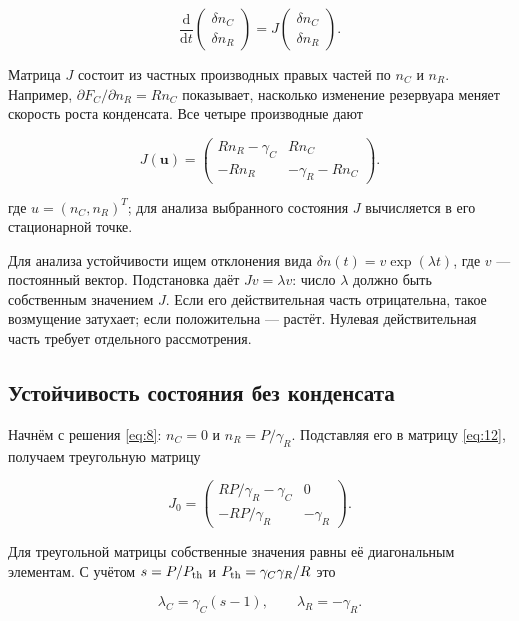 \documentclass[12pt,a4paper]{article}
\begin{document}
\[
\frac{\mathrm d}{\mathrm dt}\begin{pmatrix}\delta n_C\\\delta n_R\end{pmatrix}=J\begin{pmatrix}\delta n_C\\\delta n_R\end{pmatrix}.
\]

Матрица $J$ состоит из частных производных правых частей по $n_{C}$ и $n_{R}$. Например, $\partial F_{C}/\partial n_{R}=R n_{C}$ показывает, насколько изменение резервуара меняет скорость роста конденсата. Все четыре производные дают

\begin{equation}\label{eq:12}
J(\mathbf u)=\begin{pmatrix}Rn_R-\gamma_C&Rn_C\\-Rn_R&-\gamma_R-Rn_C\end{pmatrix}.\end{equation}

где $u=(n_{C},n_{R})^{T}$; для анализа выбранного состояния $J$ вычисляется в его стационарной точке.

Для анализа устойчивости ищем отклонения вида $\delta n(t)=v \exp(\lambda t)$, где $v$ --- постоянный вектор. Подстановка даёт $J v=\lambda v$: число $\lambda$ должно быть собственным значением $J$. Если его действительная часть отрицательна, такое возмущение затухает; если положительна --- растёт. Нулевая действительная часть требует отдельного рассмотрения.

\subsection{Устойчивость состояния без конденсата}\label{sec:3.4}

Начнём с решения \eqref{eq:8}: $n_{C}=0$ и $n_{R}=P/\gamma_{R}$. Подставляя его в матрицу \eqref{eq:12}, получаем треугольную матрицу

\[
J_0=\begin{pmatrix}RP/\gamma_R-\gamma_C&0\\-RP/\gamma_R&-\gamma_R\end{pmatrix}.
\]

Для треугольной матрицы собственные значения равны её диагональным элементам. С учётом $s=P/P_{\rm th}$ и $P_{\rm th}=\gamma_{C} \gamma_{R}/R$ это

\begin{equation}\label{eq:13}
\lambda_C=\gamma_C(s-1),\qquad\lambda_R=-\gamma_R.\end{equation}
\end{document}
